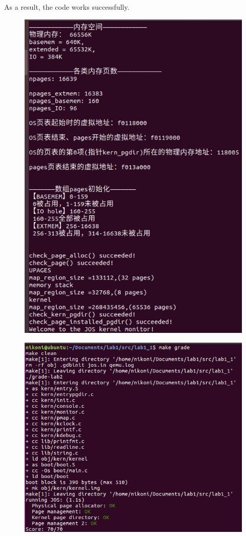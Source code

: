 As a result,  the code works successfully.

\begin{figure}[H]
\centering
\includegraphics[width=0.8\linewidth]{figure/make_qemu}
\end{figure}

\begin{figure}[H]
\centering
\includegraphics[width=0.8\linewidth]{figure/make_grade}
\end{figure}

